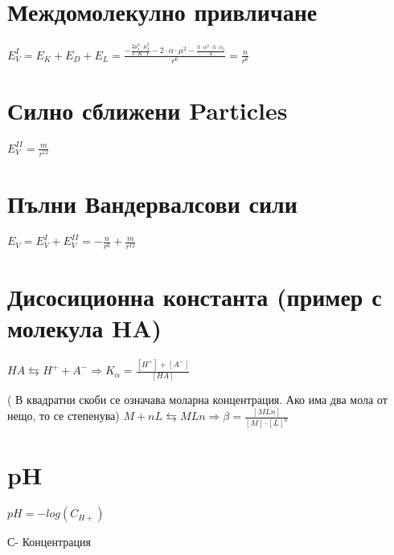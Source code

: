 \documentclass[11pt]{Article}
\begin{document}
\section{Междомолекулно привличане}
\begin{center}
{\Huge $E^I_V =E_K + E_D + E_L = \frac{- \frac{2\mu^2_1 \cdot \mu^2_2}{3 \cdot K \cdot T}- 2 \cdot \alpha \cdot \mu^2 - \frac{3 \cdot \alpha^2 \cdot h \cdot \nu_0 }{4}} {r^6} = \frac{n}{r^6}$ 
}\\

\end{center}
\newpage

\section{Силно сближени Particles}
\begin{center}
{\Huge $E^{II}_V = \frac{m}{r^{12}} $}\\
\end{center}
\newpage

\section{Пълни Вандервалсови сили}
\begin{center}
{\Huge $E_V = E^I_V + E^{II}_V = -\frac{n}{r^6} + \frac{m}{r^{12}} $}\\
\end{center}
\newpage

\section{Дисосиционна константа (пример с молекула HA)}
\begin{center}
{\Huge $ HA\leftrightarrows H^{+} + A^{-}  \Rightarrow K_\alpha = \frac{[H^{+}]+[A^{-}]}{[HA]} $}\\

\end{center}
( В квадратни скоби се означава моларна концентрация. Ако има два мола от нещо, то се степенува)
{\Huge $ M + nL \leftrightarrows MLn \Rightarrow \beta = \frac{[MLn]}{[M]\cdot[L]^n} $ }\\
\newpage

\section{pH}
\begin{center}
{\Huge $pH = -log(C_{H+}) $} \\ 
\end{center}
С- Концентрация 
\newpage
\end{document}
